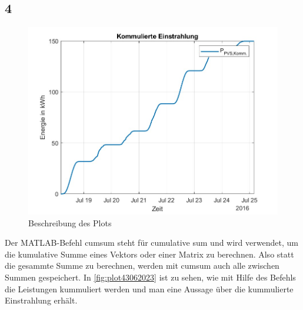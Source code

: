 \subsection{4}
\begin{figure}[H]
    \centering
    \includegraphics[width=\textwidth]{Abbildungen/plot_vorbereitungsfrage4.jpg}
    \caption{Beschreibung des Plots}
    \label{fig:plot43062023}
\end{figure}
Der MATLAB-Befehl cumsum steht für cumulative sum und wird verwendet, um die kumulative Summe eines Vektors oder einer Matrix zu berechnen. 
Also statt die gesammte Summe zu berechnen, werden mit cumsum auch alle zwischen Summen gespeichert. In \autoref{fig:plot43062023} ist zu sehen, wie mit Hilfe des Befehls die Leistungen kummuliert werden und man eine Aussage über die kummulierte Einstrahlung erhält.